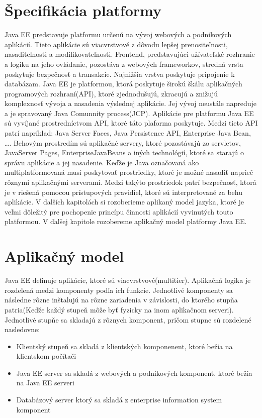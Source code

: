 \section{Špecifikácia platformy}
Java EE  predstavuje platformu určenú na vývoj webových a podnikových aplikácií\cite{fitWeb}. Tieto aplikácie sú viacvrstvové z dôvodu lepšej prenositeľnosti, nasaditeľnosti a modifikovateľnosti. Frontend, predstavujúci užívateľské rozhranie a logiku na jeho ovládanie, pozostáva z webových frameworkov, stredná vrsta poskytuje bezpečnosť a transakcie. Najnižšia vrstva poskytuje pripojenie k databázam. Java EE je platformou, ktorá poskytuje širokú škálu aplikačných programových rozhraní(API), ktoré zjednodušujú, zkracujú a znižujú komplexnosť vývoja a nasadenia výslednej aplikácie. Jej vývoj neustále napreduje a je spravovaný Java Comunnity process(JCP). Aplikácie pre platformu Java EE sú vyvíjané prostredníctvom API, ktoré táto plaforma poskytuje. Medzi tieto API patrí napríklad: Java Server Faces, Java Persistence API, Enterprise Java Bean, \ldots.  Behovým prostredím sú aplikačné servery, ktoré pozostávajú zo servletov, JavaServer Pages, EnterpriseJavaBeans a iných technológií, ktoré sa starajú o správu aplikácie a jej nasadenie. Keďže je Java označovaná ako multiplatformovaná musí poskytovať prostriedky, ktoré je možné nasadiť naprieč rôznymi aplikačnými serverami. Medzi takýto prostriedok patrí bezpečnosť, ktorá je v riešená pomocou prístupových pravidiel, ktoré sú interpretované za behu aplikácie.
 V ďalších kapitolách si rozoberieme aplikaný model jazyka, ktoré je veľmi dôležitý pre pochopenie princípu činnosti aplikácií vyvinutých touto platformou. V ďalšej kapitole rozobereme aplikačný model platformy Java EE.  


\section{Aplikačný model}
Java EE definuje aplikácie, ktoré sú viacvrstvové(multitier). Aplikačná logika je rozdelená medzi komponenty podľa ich funkcie\cite{Pravidla}. Jednotlivé komponenty sa následne rôzne inštalujú na rôzne zariadenia v závislosti, do ktorého stupňa patria(Keďže každý stupeň môže byť fyzicky na inom aplikačnom serveri). Jednotlivé stupňe sa skladajú z rôznych komponent, pričom stupne sú rozdelené nasledovne:
\begin{itemize}
\item Klientský stupeň sa skladá z klientských komponenent, ktoré bežia na klientskom počítači
\item Java EE server sa skladá z webových a podnikových komponent, ktoré bežia na Java EE serveri
\item Databázový server ktorý sa skladá z enterprise information system komponent
\end{itemize}


